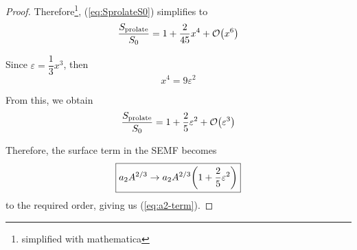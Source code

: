 \documentclass[12pt,a4paper]{article}
\begin{document}
\begin{solution_pset}
\begin{proof}
		   Therefore\footnote{simplified with mathematica}, (\ref{eq:SprolateS0}) simplifies to
		   \begin{equation}
				\label{eq:SpS0}
				\frac{
					S_\text{prolate} 
				}{
					S_0
				} 
				=
				1 + \frac{2}{45}x^4 + \order{x^6} 
		   \end{equation}

		   Since $\varepsilon = \dfrac{1}{3}x^3 $, then
		   \[
			   x^4 = 9\varepsilon^2
		   \]

		   From this, we obtain
		   \[
				\frac{
					S_\text{prolate} 
				}{
					S_0
				} 
				=
				1 + \frac{2}{5}\varepsilon^2 + \order{\varepsilon^3} 
		   \]
		   
		   Therefore, the surface term in the SEMF becomes
		   \begin{equation}
				\label{eq:SEMF-surface_term}
				\boxed{
					a_2 A^{2/3} \to a_2 A^{2/3} \pqty{1 + \frac{2}{5}\varepsilon^2 }
				}
		   \end{equation}
		   to the required order, giving us (\ref{eq:a2-term}).
		\end{proof}
		\newpage

\end{solution_pset}
\end{document}

